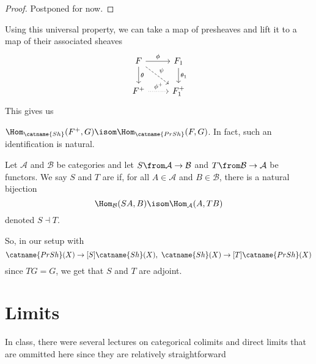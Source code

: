 \documentclass[11pt,leqno,oneside]{amsbook}
\renewcommand{\F}{F} %
\newcommand{\cA}{\mathcal{A}}
\newcommand{\cB}{\mathcal{B}}
\newcommand{\adjoint}{\dashv}
\numberwithin{thm}{section}
\begin{document}
\begin{proof}
  Postponed for now.
\end{proof}
Using this universal property, we can take a map of presheaves and
lift it to a map of their associated sheaves \[
  \begin{tikzcd}
    \F \ar[d, "\theta"]\ar[r, "\phi"] \ar[rd, dashed, "\psi"] & \F_1 \ar[d, "\theta_1"]\\
    \F^+ \ar[r, dotted, "\phi^+"] & \F_1^+
  \end{tikzcd}
\]
This gives us
\begin{prop}
  \(\Hom_{\catname{Sh}}(\F^+,G) \isom
  \Hom_{\catname{PrSh}}(F,G)\). In fact, such an identification is natural.
\end{prop}
\begin{defn}
  Let \(\cA\) and \(\cB\) be categories and let \(S \from \cA \to
  \cB\)  and \(T \from \cB \to \cA\) be functors. We say \(S\) and
  \(T\) are  if, for all \(A \in \cA\) and \(B \in \cB\),
  there is a natural bijection \[
    \Hom_{\cB}(SA,B) \isom \Hom_{\cA}(A,TB)
  \]
  denoted \(S \adjoint T\).
\end{defn}
So, in our setup with \[
  \catname{PrSh}(X) \to[S] \catname{Sh}(X), \ \catname{Sh}(X) \to[T] \catname{PrSh}(X)
\]
since \(TG = G\), we get that \(S\) and \(T\) are adjoint.
\section{Limits}
In class, there were several lectures on categorical colimits and
direct limits that are ommitted here 
since they are relatively straightforward
\end{document}
